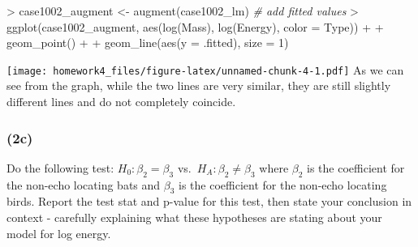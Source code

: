 \documentclass[
]{article}
\newenvironment{Shaded}{\begin{snugshade}}{\end{snugshade}}
\newcommand{\AttributeTok}[1]{\textcolor[rgb]{0.77,0.63,0.00}{#1}}
\newcommand{\CommentTok}[1]{\textcolor[rgb]{0.56,0.35,0.01}{\textit{#1}}}
\newcommand{\DecValTok}[1]{\textcolor[rgb]{0.00,0.00,0.81}{#1}}
\newcommand{\FunctionTok}[1]{\textcolor[rgb]{0.00,0.00,0.00}{#1}}
\newcommand{\NormalTok}[1]{#1}
\newcommand{\OtherTok}[1]{\textcolor[rgb]{0.56,0.35,0.01}{#1}}
\newcommand{\SpecialCharTok}[1]{\textcolor[rgb]{0.00,0.00,0.00}{#1}}
\newcommand{\StringTok}[1]{\textcolor[rgb]{0.31,0.60,0.02}{#1}}
\begin{document}
\begin{Shaded}
\begin{Highlighting}[]
\SpecialCharTok{\textgreater{}}\NormalTok{ case1002\_augment }\OtherTok{\textless{}{-}} \FunctionTok{augment}\NormalTok{(case1002\_lm)  }\CommentTok{\# add fitted values}
\SpecialCharTok{\textgreater{}} \FunctionTok{ggplot}\NormalTok{(case1002\_augment, }\FunctionTok{aes}\NormalTok{(}\StringTok{\textasciigrave{}}\AttributeTok{log(Mass)}\StringTok{\textasciigrave{}}\NormalTok{, }\StringTok{\textasciigrave{}}\AttributeTok{log(Energy)}\StringTok{\textasciigrave{}}\NormalTok{, }\AttributeTok{color =}\NormalTok{ Type)) }\SpecialCharTok{+} 
\SpecialCharTok{+}   \FunctionTok{geom\_point}\NormalTok{() }\SpecialCharTok{+} 
\SpecialCharTok{+}   \FunctionTok{geom\_line}\NormalTok{(}\FunctionTok{aes}\NormalTok{(}\AttributeTok{y =}\NormalTok{ .fitted), }\AttributeTok{size =} \DecValTok{1}\NormalTok{)}
\end{Highlighting}
\end{Shaded}

\texttt{[image: homework4\_files/figure-latex/unnamed-chunk-4-1.pdf]} As
we can see from the graph, while the two lines are very similar, they
are still slightly different lines and do not completely coincide.

\hypertarget{c}{%
\subsubsection{(2c)}\label{c}}

Do the following test: \(H_0: \beta_2 = \beta_3\)
vs.~\(H_A: \beta_2 \neq \beta_3\) where \(\beta_2\) is the coefficient
for the non-echo locating bats and \(\beta_3\) is the coefficient for
the non-echo locating birds. Report the test stat and p-value for this
test, then state your conclusion in context - carefully explaining what
these hypotheses are stating about your model for log energy.
\end{document}

